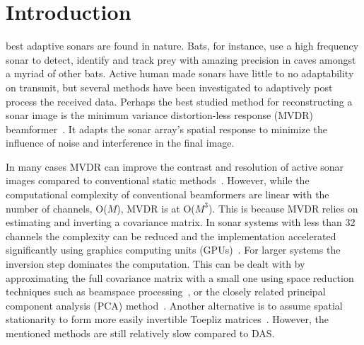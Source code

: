 \documentclass[10pt,journal,draftclsnofoot,onecolumn]{IEEEtran}
\newcommand\1{\vec 1}
\begin{document}
\IEEEdisplaynotcompsoctitleabstractindextext


\IEEEpeerreviewmaketitle

\section{Introduction}


 best adaptive sonars are found in nature. Bats, for instance, use a high frequency sonar to detect, identify and track prey with amazing precision in caves amongst a myriad of other bats. Active human made sonars have little to no adaptability on transmit, but several methods have been investigated to adaptively post process the received data. Perhaps the best studied method for reconstructing a sonar image is the minimum variance distortion-less response (MVDR) beamformer~\cite{Capon1969}. It adapts the sonar array's spatial response to minimize the influence of noise and interference in the final image.

In many cases MVDR can improve the contrast and resolution of active sonar images compared to conventional static methods~\cite{Blomberg2013,Blomberg2012a,Lo2004}. However, while the computational complexity of conventional beamformers are linear with the number of channels, O($M$), MVDR is at O($M^3$). This is because MVDR relies on estimating and inverting a covariance matrix. In sonar systems with less than 32 channels the complexity can be reduced and the implementation accelerated significantly using graphics computing units (GPUs)~\cite{Buskenes2014}. For larger systems the inversion step dominates the computation. This can be dealt with by approximating the full covariance matrix with a small one using space reduction techniques such as beamspace processing~\cite{Asen2013}, or the closely related principal component analysis (PCA) method~\cite{Kim2014}. Another alternative is to assume spatial stationarity to form more easily invertible Toepliz matrices~\cite{Asl2012}. However, the  mentioned methods are still relatively slow compared to DAS.
\end{document}
